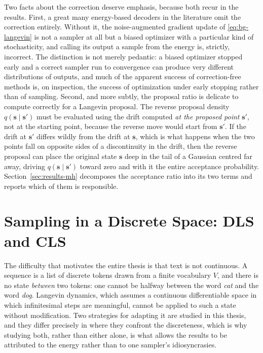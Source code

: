 Two facts about the correction deserve emphasis, because both recur in the results. First, a great many energy-based decoders in the literature omit the correction entirely. Without it, the noise-augmented gradient update of \eqref{eq:bg-langevin} is not a sampler at all but a biased optimizer with a particular kind of stochasticity, and calling its output a sample from the energy is, strictly, incorrect. The distinction is not merely pedantic: a biased optimizer stopped early and a correct sampler run to convergence can produce very different distributions of outputs, and much of the apparent success of correction-free methods is, on inspection, the success of optimization under early stopping rather than of sampling. Second, and more subtly, the proposal ratio is delicate to compute correctly for a Langevin proposal. The reverse proposal density $q(\bm{s} \mid \bm{s}')$ must be evaluated using the drift computed \emph{at the proposed point} $\bm{s}'$, not at the starting point, because the reverse move would start from $\bm{s}'$. If the drift at $\bm{s}'$ differs wildly from the drift at $\bm{s}$, which is what happens when the two points fall on opposite sides of a discontinuity in the drift, then the reverse proposal can place the original state $\bm{s}$ deep in the tail of a Gaussian centred far away, driving $q(\bm{s} \mid \bm{s}')$ toward zero and with it the entire acceptance probability. Section~\ref{sec:results-mh} decomposes the acceptance ratio into its two terms and reports which of them is responsible.

\section{Sampling in a Discrete Space: DLS and CLS}
\label{sec:bg-samplers}

The difficulty that motivates the entire thesis is that text is not continuous. A sequence is a list of discrete tokens drawn from a finite vocabulary $V$, and there is no state \emph{between} two tokens: one cannot be halfway between the word \emph{cat} and the word \emph{dog}. Langevin dynamics, which assumes a continuous differentiable space in which infinitesimal steps are meaningful, cannot be applied to such a state without modification. Two strategies for adapting it are studied in this thesis, and they differ precisely in where they confront the discreteness, which is why studying both, rather than either alone, is what allows the results to be attributed to the energy rather than to one sampler's idiosyncrasies.

